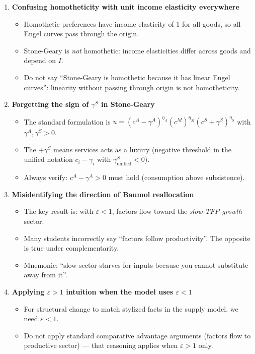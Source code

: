 \documentclass[a4paper,11pt]{article}
\begin{document}
\begin{enumerate}

    \item \textbf{Confusing homotheticity with unit income elasticity everywhere}
    \begin{itemize}
        \item Homothetic preferences have income elasticity of 1 for all goods, so all Engel curves pass through the origin.
        \item Stone-Geary is \emph{not} homothetic: income elasticities differ across goods and depend on $I$.
        \item Do not say ``Stone-Geary is homothetic because it has linear Engel curves'': linearity without passing through origin is not homotheticity.
    \end{itemize}

    \item \textbf{Forgetting the sign of $\gamma^S$ in Stone-Geary}
    \begin{itemize}
        \item The standard formulation is $u = (c^A - \gamma^A)^{\eta_A}(c^M)^{\eta_M}(c^S + \gamma^S)^{\eta_S}$ with $\gamma^A, \gamma^S > 0$.
        \item The $+\gamma^S$ means services acts as a luxury (negative threshold in the unified notation $c_i - \gamma_i$ with $\gamma^S_{\text{unified}} < 0$).
        \item Always verify: $c^A - \gamma^A > 0$ must hold (consumption above subsistence).
    \end{itemize}

    \item \textbf{Misidentifying the direction of Baumol reallocation}
    \begin{itemize}
        \item The key result is: with $\varepsilon < 1$, factors flow toward the \emph{slow-TFP-growth} sector.
        \item Many students incorrectly say ``factors follow productivity''. The opposite is true under complementarity.
        \item Mnemonic: ``slow sector starves for inputs because you cannot substitute away from it''.
    \end{itemize}

    \item \textbf{Applying $\varepsilon > 1$ intuition when the model uses $\varepsilon < 1$}
    \begin{itemize}
        \item For structural change to match stylized facts in the supply model, we need $\varepsilon < 1$.
        \item Do not apply standard comparative advantage arguments (factors flow to productive sector) --- that reasoning applies when $\varepsilon > 1$ only.
    \end{itemize}


\end{enumerate}
\end{document}
